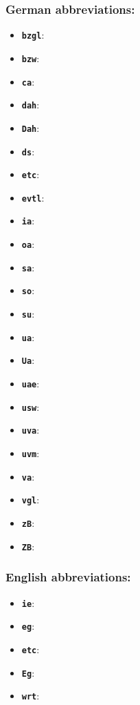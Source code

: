 \documentclass[language=english]{hgbarticle}
\begin{document}
\subsubsection*{German abbreviations:}

\begin{itemize}
    \item \textbf{\texttt{{\bs}bzgl}}: 	\bzgl
    \item \textbf{\texttt{{\bs}bzw}}: 	\bzw
    \item \textbf{\texttt{{\bs}ca}}: 		\ca
    \item \textbf{\texttt{{\bs}dah}}: 	\dah
    \item \textbf{\texttt{{\bs}Dah}}: 	\Dah
    \item \textbf{\texttt{{\bs}ds}}: 		\ds
    \item \textbf{\texttt{{\bs}etc}}: 	\etc
    \item \textbf{\texttt{{\bs}evtl}}: 	\evtl
    \item \textbf{\texttt{{\bs}ia}}: 		\ia
		\item \textbf{\texttt{{\bs}oa}}: 		\oa
    \item \textbf{\texttt{{\bs}sa}}: 		\sa
    \item \textbf{\texttt{{\bs}so}}: 		\so
    \item \textbf{\texttt{{\bs}su}}: 		\su
    \item \textbf{\texttt{{\bs}ua}}: 		\ua
    \item \textbf{\texttt{{\bs}Ua}}: 		\Ua
    \item \textbf{\texttt{{\bs}uae}}: 	\uae
    \item \textbf{\texttt{{\bs}usw}}: 	\usw
    \item \textbf{\texttt{{\bs}uva}}: 	\uva
    \item \textbf{\texttt{{\bs}uvm}}: 	\uvm
    \item \textbf{\texttt{{\bs}va}}: 		\va
    \item \textbf{\texttt{{\bs}vgl}}: 	\vgl
    \item \textbf{\texttt{{\bs}zB}}: 		\zB
    \item \textbf{\texttt{{\bs}ZB}}: 		\ZB
\end{itemize}

\subsubsection*{English abbreviations:}

\begin{itemize}
    \item \textbf{\texttt{{\bs}ie}}: 	\ie
    \item \textbf{\texttt{{\bs}eg}}: 	\eg
    \item \textbf{\texttt{{\bs}etc}}: \etc
    \item \textbf{\texttt{{\bs}Eg}}: 	\Eg
    \item \textbf{\texttt{{\bs}wrt}}: \wrt
\end{itemize}
\end{document}
